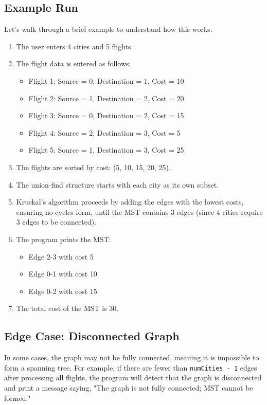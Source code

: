 \documentclass{book}
\begin{document}
\subsection{Example Run}

Let’s walk through a brief example to understand how this works.

\begin{enumerate}
    \item The user enters 4 cities and 5 flights.
    \item The flight data is entered as follows:
    \begin{itemize}
        \item Flight 1: Source = 0, Destination = 1, Cost = 10
        \item Flight 2: Source = 1, Destination = 2, Cost = 20
        \item Flight 3: Source = 0, Destination = 2, Cost = 15
        \item Flight 4: Source = 2, Destination = 3, Cost = 5
        \item Flight 5: Source = 1, Destination = 3, Cost = 25
    \end{itemize}
    \item The flights are sorted by cost: (5, 10, 15, 20, 25).
    \item The union-find structure starts with each city as its own subset.
    \item Kruskal’s algorithm proceeds by adding the edges with the lowest costs, ensuring no cycles form, until the MST contains 3 edges (since 4 cities require 3 edges to be connected).
    \item The program prints the MST:
    \begin{itemize}
        \item Edge 2-3 with cost 5
        \item Edge 0-1 with cost 10
        \item Edge 0-2 with cost 15
    \end{itemize}
    \item The total cost of the MST is 30.
\end{enumerate}

\subsection{Edge Case: Disconnected Graph}

In some cases, the graph may not be fully connected, meaning it is impossible to form a spanning tree. For example, if there are fewer than \texttt{numCities - 1} edges after processing all flights, the program will detect that the graph is disconnected and print a message saying, "The graph is not fully connected; MST cannot be formed."
\end{document}
